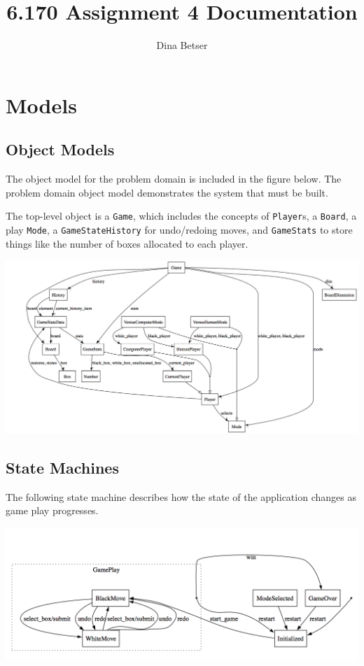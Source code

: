 \documentclass[11pt,letterpaper]{article}
\title{6.170 Assignment 4 Documentation}
\author{Dina Betser}
\begin{document}
\maketitle

\section{Models}
\subsection{Object Models}
The object model for the problem domain is included in the figure below. The problem domain object model demonstrates the system that must be built. 

The top-level object is a \texttt{Game}, which includes the concepts of \texttt{Player}s, a \texttt{Board}, a play \texttt{Mode}, a \texttt{GameStateHistory} for undo/redoing moves, and \texttt{GameStats} to store things like the number of boxes allocated to each player.
\begin{center}
\includegraphics[width=10.5in, angle=90]{dot/obmod.png}
\label{fig:ob1} 
\end{center}

\subsection{State Machines}
The following state machine describes how the state of the application changes as game play progresses.
\begin{center}
\includegraphics[width=7in]{dot/statediag.png}
\label{fig:sm1} 
\end{center}
\end{document}
